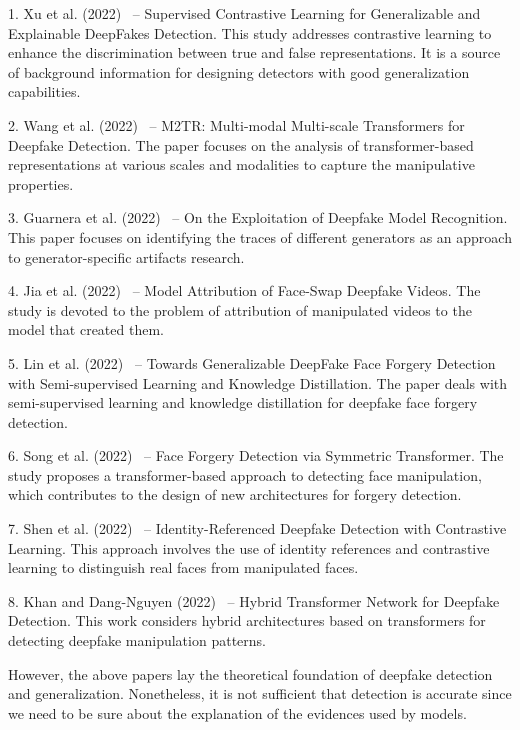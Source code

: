 \documentclass[12pt,a4wide]{report}
\theoremstyle{plain}
\theoremstyle{definition}
\theoremstyle{remark}
\begin{document}
\begin{description}

  \item 1. Xu et al. (2022)~\cite{xu2022supcon} – Supervised Contrastive Learning for Generalizable and Explainable DeepFakes Detection. This study addresses contrastive learning to enhance the discrimination between true and false representations. It is a source of background information for designing detectors with good generalization capabilities.

  \item 2. Wang et al. (2022)~\cite{wang2022m2tr} – M2TR: Multi-modal Multi-scale Transformers for Deepfake Detection. The paper focuses on the analysis of transformer-based representations at various scales and modalities to capture the manipulative properties.

  \item 3. Guarnera et al. (2022)~\cite{guarnera2022exploitation} – On the Exploitation of Deepfake Model Recognition. This paper focuses on identifying the traces of different generators as an approach to generator-specific artifacts research.

  \item 4. Jia et al. (2022)~\cite{jia2022attribution} – Model Attribution of Face-Swap Deepfake Videos. The study is devoted to the problem of attribution of manipulated videos to the model that created them.

  \item 5. Lin et al. (2022)~\cite{lin2022sclkd} – Towards Generalizable DeepFake Face Forgery Detection with Semi-supervised Learning and Knowledge Distillation. The paper deals with semi-supervised learning and knowledge distillation for deepfake face forgery detection.

  \item 6. Song et al. (2022)~\cite{song2022symmetric} – Face Forgery Detection via Symmetric Transformer. The study proposes a transformer-based approach to detecting face manipulation, which contributes to the design of new architectures for forgery detection.

  \item 7. Shen et al. (2022)~\cite{shen2022identity} – Identity-Referenced Deepfake Detection with Contrastive Learning. This approach involves the use of identity references and contrastive learning to distinguish real faces from manipulated faces.

   \item 8. Khan and Dang-Nguyen (2022)~\cite{khan2022hybrid} – Hybrid Transformer Network for Deepfake Detection. This work considers hybrid architectures based on transformers for detecting deepfake manipulation patterns.\\
\end{description}
However, the above papers lay the theoretical foundation of deepfake detection and generalization. Nonetheless, it is not sufficient that detection is accurate since we need to be sure about the explanation of the evidences used by models.
\end{document}
